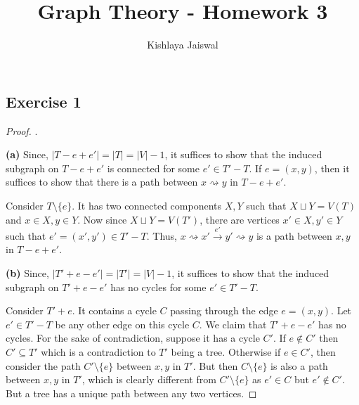 \documentclass[12pt]{article}
\title{Graph Theory - Homework 3}
\author{Kishlaya Jaiswal}
\begin{document}
\maketitle

\vspace{0.5in}


\subsection*{Exercise 1}
\begin{proof}.

\textbf{(a)} Since, $|T-e+e'| = |T| = |V|-1$, it suffices to show that the induced subgraph on $T-e+e'$ is connected for some $e' \in T'-T$. If $e=(x,y)$, then it suffices to show that there is a path between $x \rightsquigarrow y$ in $T-e+e'$. 

Consider $T \setminus \{e\}$. It has two connected components $X, Y$ such that $X \sqcup Y = V(T)$ and $x \in X, y \in Y$. Now since $X \sqcup Y = V(T')$, there are vertices $x' \in X, y' \in Y$ such that $e' = (x',y') \in T' - T$. Thus, $x \rightsquigarrow x' \xrightarrow{e'} y' \rightsquigarrow y$ is a path between $x,y$ in $T-e+e'$.
\newline 

\textbf{(b)} Since, $|T'+e-e'| = |T'| = |V|-1$, it suffices to show that the induced subgraph on $T'+e-e'$ has no cycles for some $e' \in T'-T$.

Consider $T'+e$. It contains a cycle $C$ passing through the edge $e=(x,y)$. Let $e' \in T'-T$ be any other edge on this cycle $C$. We claim that $T'+e-e'$ has no cycles. For the sake of contradiction, suppose it has a cycle $C'$. If $e \not \in C'$ then $C' \subseteq T'$ which is a contradiction to $T'$ being a tree. Otherwise if $e \in C'$, then consider the path $C' \setminus \{e\}$ between $x,y$ in $T'$. But then $C \setminus \{e\}$ is also a path between $x,y$ in $T'$, which is clearly different from $C' \setminus \{e\}$ as $e' \in C$ but $e' \not \in C'$. But a tree has a unique path between any two vertices.
\end{proof}
\end{document}
